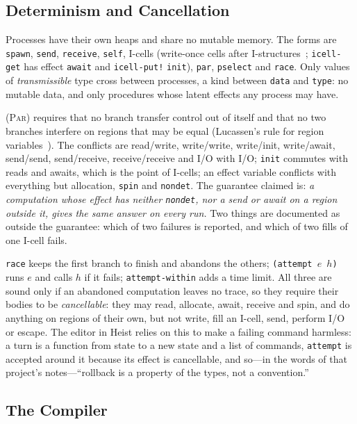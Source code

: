 \documentclass[acmsmall,screen,review]{acmart}
\newcommand{\cd}[1]{\texttt{#1}}
\begin{document}
\subsection{Determinism and Cancellation}
\label{sec:conc}

Processes have their own heaps and share no mutable memory. The forms
are \cd{spawn}, \cd{send}, \cd{receive}, \cd{self}, I-cells
(write-once cells after I-structures~\cite{i-structures}; \cd{icell-get}
has effect \cd{await} and \cd{icell-put!} \cd{init}), \cd{par},
\cd{pselect} and \cd{race}. Only values of \emph{transmissible} type
cross between processes, a kind between \cd{data} and \cd{type}: no
mutable data, and only procedures whose latent effects any process may
have.

\textsc{(Par)} requires that no branch transfer control out of itself
and that no two branches interfere on regions that may be equal
(Lucassen's rule for region variables~\cite{lucassen-thesis}). The
conflicts are read/write, write/write, write/init, write/await,
send/send, send/receive, receive/receive and I/O with I/O; \cd{init}
commutes with reads and awaits, which is the point of I-cells; an
effect variable conflicts with everything but allocation, \cd{spin} and
\cd{nondet}. The guarantee claimed is: \emph{a computation whose effect
has neither \cd{nondet}, nor a send or await on a region outside it,
gives the same answer on every run.} Two things are documented as
outside the guarantee: which of two failures is reported, and which of
two fills of one I-cell fails.

\cd{race} keeps the first branch to finish and abandons the others;
\cd{(attempt $e$ $h$)} runs $e$ and calls $h$ if it fails;
\cd{attempt-within} adds a time limit. All three are sound only if an
abandoned computation leaves no trace, so they require their bodies to
be \emph{cancellable}: they may read, allocate, await, receive and
spin, and do anything on regions of their own, but not write, fill an
I-cell, send, perform I/O or escape. The editor in Heist relies on this
to make a failing command harmless: a turn is a function from state to
a new state and a list of commands, \cd{attempt} is accepted around it
because its effect is cancellable, and so---in the words of that
project's notes---``rollback is a property of the types, not a
convention.''

\subsection{The Compiler}
\label{sec:compiler-licence}
\end{document}
